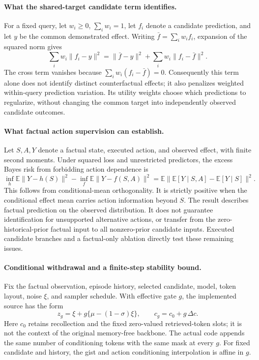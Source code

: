 \paragraph{What the shared-target candidate term identifies.}
For a fixed query, let $w_i\geq0$, $\sum_iw_i=1$, let $f_i$ denote a
candidate prediction, and let $y$ be the common demonstrated effect.
Writing $\bar f=\sum_iw_if_i$, expansion of the squared norm gives
\[
 \sum_iw_i\|f_i-y\|^2
 =\|\bar f-y\|^2+\sum_iw_i\|f_i-\bar f\|^2.
\]
The cross term vanishes because $\sum_iw_i(f_i-\bar f)=0$.
Consequently this term alone does not identify distinct counterfactual effects;
it also penalizes weighted within-query prediction variation.
Its utility weights choose which predictions to regularize, without changing
the common target into independently observed candidate outcomes.

\paragraph{What factual action supervision can establish.}
Let $S,A,Y$ denote a factual state, executed action, and observed effect, with
finite second moments. Under squared loss and unrestricted predictors,
the excess Bayes risk from forbidding action dependence is
\[
 \inf_h\mathbb E\|Y-h(S)\|^2-
 \inf_f\mathbb E\|Y-f(S,A)\|^2
 =\mathbb E\|\mathbb E[Y\mid S,A]-\mathbb E[Y\mid S]\|^2.
\]
This follows from conditional-mean orthogonality. It is strictly positive
when the conditional effect mean carries action information beyond $S$.
The result describes factual prediction on the observed distribution.
It does not guarantee identification for unsupported alternative actions,
or transfer from the zero-historical-prior factual input to all nonzero-prior
candidate inputs. Executed candidate branches and a factual-only ablation
directly test these remaining issues.

\paragraph{Conditional withdrawal and a finite-step stability bound.}
Fix the factual observation, episode history, selected candidate, model,
token layout, noise $\xi$, and sampler schedule. With effective gate $g$,
the implemented source has the form
\[
 z_g=\xi+g\{\mu-(1-\sigma)\xi\},\qquad
 c_g=c_0+g\,\Delta c.
\]
Here $c_0$ retains recollection and the fixed zero-valued retrieved-token
slots; it is not the context of the original memory-free backbone.
The actual code appends the same number of conditioning tokens with the
same mask at every $g$. For fixed candidate and history, the gist and action
conditioning interpolation is affine in $g$.

